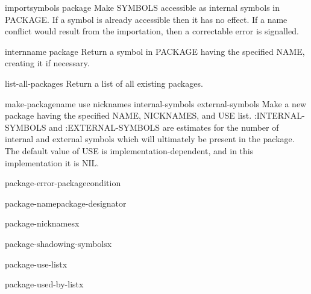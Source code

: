 \documentclass[10pt,english]{book}
\begin{document}
\begin{function}{import}{symbols \op package}
  Make SYMBOLS accessible as internal symbols in PACKAGE. If a symbol is
already accessible then it has no effect. If a name conflict would result from
the importation, then a correctable error is signalled.
\end{function}

\begin{function}{intern}{name \op package}
  Return a symbol in PACKAGE having the specified NAME, creating it
  if necessary.
\end{function}

\begin{function}{list-all-packages}{}
  Return a list of all existing packages.
\end{function}

\begin{function}{make-package}{name \key use nicknames internal-symbols external-symbols}
  Make a new package having the specified NAME, NICKNAMES, and USE
list. :INTERNAL-SYMBOLS and :EXTERNAL-SYMBOLS are estimates for the number of
internal and external symbols which will ultimately be present in the package.
The default value of USE is implementation-dependent, and in this
implementation it is NIL.
\end{function}

\begin{function}{package-error-package}{condition}
  
\end{function}

\begin{function}{package-name}{package-designator}
  
\end{function}

\begin{function}{package-nicknames}{x}
  
\end{function}

\begin{function}{package-shadowing-symbols}{x}
  
\end{function}

\begin{function}{package-use-list}{x}
  
\end{function}

\begin{function}{package-used-by-list}{x}
  
\end{function}
\end{document}
